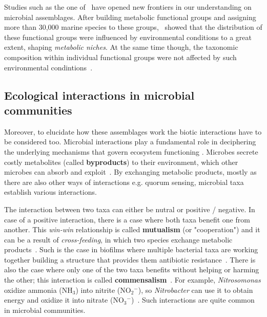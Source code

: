       Studies such as the one of~\citeauthor{louca2016decoupling}
      have opened new frontiers in our understanding on microbial assemblages. 
      After building metabolic functional groups and assigning more than 30,000 marine 
      species to these groups,~\citeauthor{louca2016decoupling} showed 
      that the distribution of these functional groups were influenced by environmental 
      conditions to a great extent, shaping \textit{metabolic niches}.
      At the same time though, the taxonomic composition within individual functional groups
      were not affected by such environmental condintions~\cite{louca2016decoupling}.

   \subsection{Ecological interactions in microbial communities}
   \label{subsec:ecol_interactions}
      Moreover, to elucidate how these assemblages work the biotic interactions have to be 
      considered too. 
      Microbial interactions play a fundamental role in deciphering the underlying mechanisms that govern ecosystem functioning \cite{braga2016microbial, faust2012microbial}. 
      Microbes secrete costly metabolites (called \textbf{byproducts}) to their environment, 
      which other microbes can absorb and exploit~\cite{pacheco2019costless}.
      By exchanging metabolic products, mostly as there are also other ways of interactions 
      e.g. quorum sensing, microbial taxa establish various interactions. 
      
      The interaction between two taxa can either be nutral or 
      positive / negative.
      In case of a positive interaction, 
      there is a case where both taxa benefit one from another.
      This \textit{win-win} relationship is called \textbf{mutualism} (or "cooperation")
      and it can be a result of
      \textit{cross-feeding}, in which two species exchange metabolic products~\cite{faust2012microbial}.
      Such is the case in biofilms where multiple bacterial taxa are working together  
      building a structure that provides them antibiotic resistance~\cite{santos2019evolutionary}.
      There is also the case where only one of the two taxa
      benefits without helping or harming the other; 
      this interaction is called \textbf{commensalism}~\cite{faust2012microbial}. 
      For example, \textit{Nitrosomonas} oxidize ammonia (NH$_3$) into nitrite (NO${_2}^{-}$), so  
      \textit{Nitrobacter} can use it to obtain energy and oxidize it into nitrate (NO${_3}^{-}$)~\cite{laanbroek2002nitrite}.
      Such interactions are quite common in microbial communities.

